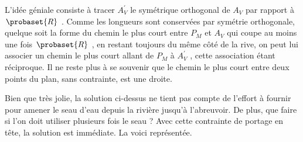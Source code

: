 \smallskip
\begin{center}
\end{center}


\medskip


L'idée géniale consiste à tracer $A_V^\prime$ le symétrique orthogonal de $A_V$ par rapport à $\probaset{R}$ . Comme les longueurs sont conservées par symétrie orthogonale, quelque soit la forme du chemin le plus court entre $P_M$ et $A_V$ qui coupe au moins une fois $\probaset{R}$ , en restant toujours du même côté de la rive, on peut lui associer un chemin le plus court allant de $P_M$ à $A_V^\prime$ , cette association étant réciproque. Il ne reste plus à se souvenir que le chemin le plus court entre deux points du plan, sans contrainte, est une droite.


\medskip


Bien que très jolie, la solution ci-dessus ne tient pas compte de l'effort à fournir pour amener le seau d'eau depuis la rivière jusqu'à l'abreuvoir. De plus, que faire si l'on doit utiliser plusieurs fois le seau ? Avec cette contrainte de portage en tête, la solution est immédiate. La voici représentée.

\smallskip
\begin{center}
\end{center}